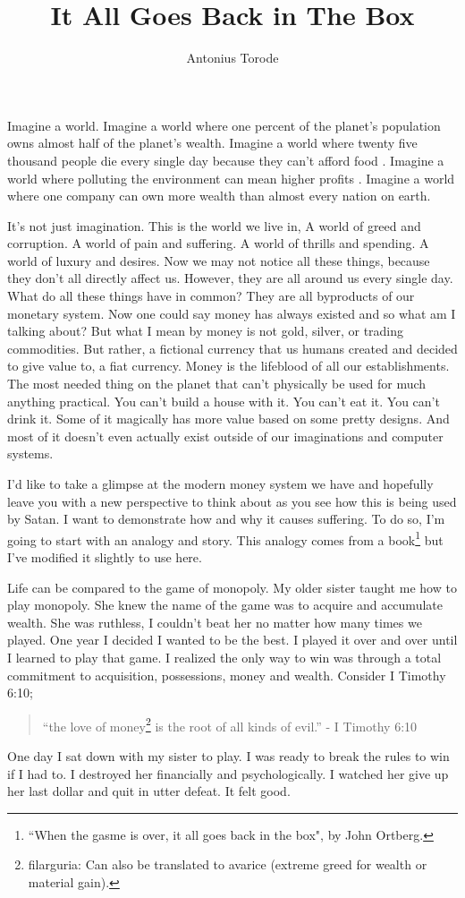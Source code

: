 \documentclass[11pt]{article}
\title{It All Goes Back in The Box}
\author{Antonius Torode}
\begin{document}
\maketitle
\thispagestyle{fancy}

\begin{multicols}{2}
Imagine a world. Imagine a world where one percent of the planet's population owns almost half of the planet's wealth\cite{Suisse, wealth inequality}. Imagine a world where twenty five thousand people die every single day because they can't afford food \cite{Unicef}. Imagine a world where polluting the environment can mean higher profits \cite{pollution}. Imagine a world where one company can own more wealth than almost every nation on earth.

It’s not just imagination. This is the world we live in, A world of greed and corruption. A world of pain and suffering. A world of thrills and spending. A world of luxury and desires. Now we may not notice all these things, because they don’t all directly affect us. However, they are all around us every single day. What do all these things have in common? They are all byproducts of our monetary system. Now one could say money has always existed and so what am I talking about? But what I mean by money is not gold, silver, or trading commodities. But rather, a fictional currency that us humans created and decided to give value to, a fiat currency. Money is the lifeblood of all our establishments. The most needed thing on the planet that can't physically be used for much anything practical. You can’t build a house with it. You can’t eat it. You can’t drink it. Some of it magically has more value based on some pretty designs. And most of it doesn't even actually exist outside of our imaginations and computer systems.

I’d like to take a glimpse at the modern money system we have and hopefully leave you with a new perspective to think about as you see how this is being used by Satan. I want to demonstrate how and why it causes suffering. To do so, I’m going to start with an analogy and story. This analogy comes from a book\footnote{``When the gasme is over, it all goes back in the box", by John Ortberg.} but I've modified it slightly to use here.

Life can be compared to the game of monopoly. My older sister taught me how to play monopoly. She knew the name of the game was to acquire and accumulate wealth. She was ruthless, I couldn't beat her no matter how many times we played. One year I decided I wanted to be the best. I played it over and over until I learned to play that game. I realized the only way to win was through a total commitment to acquisition, possessions, money and wealth. Consider I Timothy 6:10;
\begin{quotation}
``the love of money\footnote{filarguria: Can also be translated to avarice (extreme greed for wealth or material gain).} is the root of all kinds of evil.” - I Timothy 6:10
\end{quotation}
One day I sat down with my sister to play. I was ready to break the rules to win if I had to. I destroyed her financially and psychologically. I watched her give up her last dollar and quit in utter defeat. It felt good.


\end{multicols}
\end{document}

